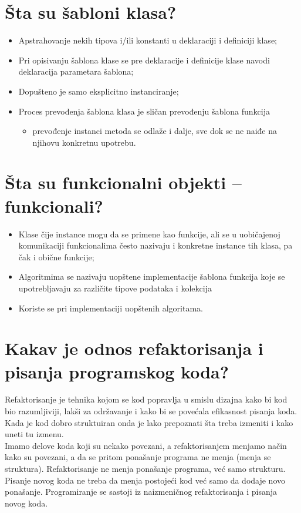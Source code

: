\documentclass[a4paper]{article}
\begin{document}
\section{Šta su šabloni klasa?}
  \begin{itemize}
    \item Apstrahovanje nekih tipova i/ili konstanti u deklaraciji i definiciji klase;
    \item Pri opisivanju šablona klase se pre deklaracije i definicije klase navodi deklaracija parametara šablona;
    \item Dopušteno je samo eksplicitno instanciranje;
    \item Proces prevođenja šablona klasa je sličan prevođenju šablona funkcija 
	\begin{itemize}
		\item prevođenje instanci metoda se odlaže i dalje, sve dok se ne naiđe na njihovu konkretnu upotrebu.
	\end{itemize}
  \end{itemize}

\section{Šta su funkcionalni objekti – funkcionali?}
  \begin{itemize}
    \item Klase čije instance mogu da se primene kao funkcije, ali se u uobičajenoj komunikaciji funkcionalima često nazivaju i konkretne instance tih klasa, pa čak i obične funkcije;
    \item Algoritmima se nazivaju uopštene implementacije šablona funkcija koje se upotrebljavaju za različite tipove podataka i kolekcija
    \item Koriste se pri implementaciji uopštenih algoritama.
  \end{itemize}


\section{Kakav je odnos refaktorisanja i pisanja programskog koda?}
  Refaktorisanje je tehnika kojom se kod popravlja u smislu dizajna kako bi kod bio razumljiviji, 
  lakši za održavanje i kako bi se povećala efikasnost pisanja koda. 
  Kada je kod dobro struktuiran onda je lako prepoznati šta treba izmeniti i kako
  uneti tu izmenu. \\
  \indent Imamo delove koda koji su nekako povezani, a refaktorisanjem menjamo način kako su povezani,
  a da se pritom ponašanje programa ne menja (menja se struktura). Refaktorisanje ne menja
  ponašanje programa, već samo strukturu.\\
  \indent Pisanje novog koda ne treba da menja postojeći kod već samo da dodaje novo ponašanje. 
  Programiranje se sastoji iz naizmeničnog refaktorisanja i pisanja novog koda.
\end{document}

